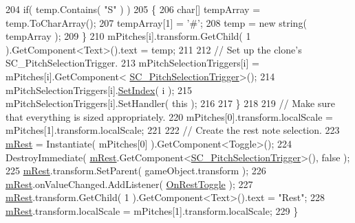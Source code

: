 \begin{DoxyCode}
204             \textcolor{keywordflow}{if}( temp.Contains( \textcolor{stringliteral}{"S"} ) )
205             \{
206                 \textcolor{keywordtype}{char}[] tempArray = temp.ToCharArray();
207                 tempArray[1] = \textcolor{charliteral}{'#'};
208                 temp = \textcolor{keyword}{new} string( tempArray );
209             \}
210             mPitches[i].transform.GetChild( 1 ).GetComponent<Text>().text = temp;
211 
212             \textcolor{comment}{// Set up the clone's SC\_PitchSelectionTrigger.}
213             mPitchSelectionTriggers[i] = mPitches[i].GetComponent<
      \hyperlink{class_s_c___pitch_selection_trigger}{SC\_PitchSelectionTrigger}>();
214             mPitchSelectionTriggers[i].\hyperlink{group___s_c___p_s_t_pub_func_ga0b4edbf9719a384aa5cf8d29d1065696}{SetIndex}( i );
215             mPitchSelectionTriggers[i].SetHandler( \textcolor{keyword}{this} );
216 
217         \}
218 
219         \textcolor{comment}{// Make sure that everything is sized appropriately.}
220         mPitches[0].transform.localScale = mPitches[1].transform.localScale;
221 
222         \textcolor{comment}{// Create the rest note selection.}
223         \hyperlink{group___s_c___p_s_c_priv_var_gae4378d4e0b53501eb0f55b8af38a5a8c}{mRest} = Instantiate( mPitches[0] ).GetComponent<Toggle>();
224         DestroyImmediate( \hyperlink{group___s_c___p_s_c_priv_var_gae4378d4e0b53501eb0f55b8af38a5a8c}{mRest}.GetComponent<\hyperlink{class_s_c___pitch_selection_trigger}{SC\_PitchSelectionTrigger}>(), \textcolor{keyword}{
      false} );
225         \hyperlink{group___s_c___p_s_c_priv_var_gae4378d4e0b53501eb0f55b8af38a5a8c}{mRest}.transform.SetParent( gameObject.transform );
226         \hyperlink{group___s_c___p_s_c_priv_var_gae4378d4e0b53501eb0f55b8af38a5a8c}{mRest}.onValueChanged.AddListener( \hyperlink{group___s_c___p_s_c_handlers_ga8715b5976fdae2c56e05a60832553864}{OnRestToggle} );
227         \hyperlink{group___s_c___p_s_c_priv_var_gae4378d4e0b53501eb0f55b8af38a5a8c}{mRest}.transform.GetChild( 1 ).GetComponent<Text>().text = \textcolor{stringliteral}{"Rest"};
228         \hyperlink{group___s_c___p_s_c_priv_var_gae4378d4e0b53501eb0f55b8af38a5a8c}{mRest}.transform.localScale = mPitches[1].transform.localScale;
229     \}
\end{DoxyCode}
